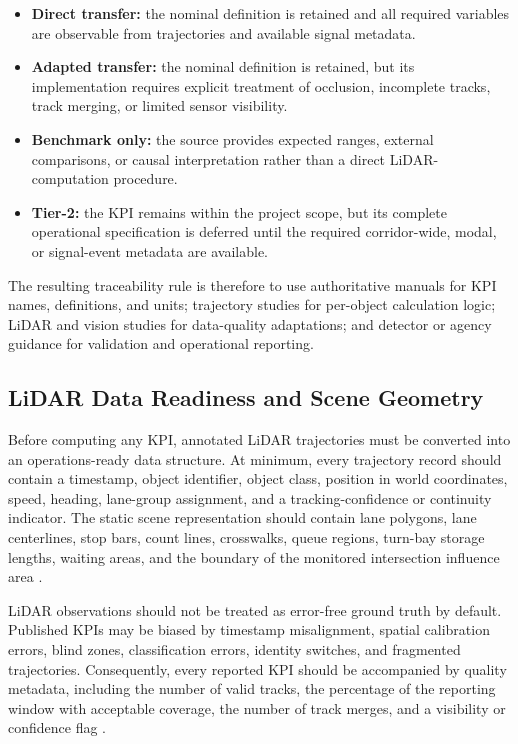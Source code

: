 \documentclass[11pt]{article}
\begin{document}
\begin{itemize}
    \item \textbf{Direct transfer:} the nominal definition is retained and all
    required variables are observable from trajectories and available signal
    metadata.

    \item \textbf{Adapted transfer:} the nominal definition is retained, but
    its implementation requires explicit treatment of occlusion, incomplete
    tracks, track merging, or limited sensor visibility.

    \item \textbf{Benchmark only:} the source provides expected ranges,
    external comparisons, or causal interpretation rather than a direct
    LiDAR-computation procedure.

    \item \textbf{Tier-2:} the KPI remains within the project scope, but its
    complete operational specification is deferred until the required
    corridor-wide, modal, or signal-event metadata are available.
\end{itemize}

The resulting traceability rule is therefore to use authoritative manuals for
KPI names, definitions, and units; trajectory studies for per-object
calculation logic; LiDAR and vision studies for data-quality adaptations; and
detector or agency guidance for validation and operational reporting.

\subsection{LiDAR Data Readiness and Scene Geometry}

Before computing any KPI, annotated LiDAR trajectories must be converted into
an operations-ready data structure. At minimum, every trajectory record should
contain a timestamp, object identifier, object class, position in world
coordinates, speed, heading, lane-group assignment, and a tracking-confidence
or continuity indicator. The static scene representation should contain lane
polygons, lane centerlines, stop bars, count lines, crosswalks, queue regions,
turn-bay storage lengths, waiting areas, and the boundary of the monitored
intersection influence area
\cite{fhwa2006detectors,zimmer2023infradet3d,nayak2025dual}.

LiDAR observations should not be treated as error-free ground truth by
default. Published KPIs may be biased by timestamp misalignment, spatial
calibration errors, blind zones, classification errors, identity switches, and
fragmented trajectories. Consequently, every reported KPI should be
accompanied by quality metadata, including the number of valid tracks, the
percentage of the reporting window with acceptable coverage, the number of
track merges, and a visibility or confidence flag
\cite{kloeker2020multilidar,shang2026roadside}.
\end{document}
